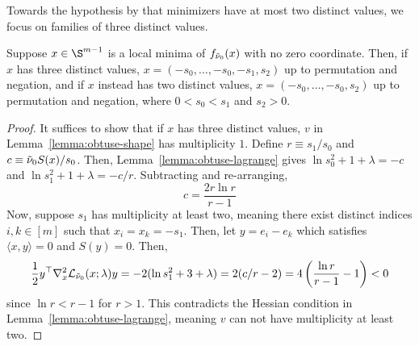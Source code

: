\documentclass[11pt]{article}
\begin{document}
Towards the hypothesis by \citep{holevo2025quantum} that minimizers have at most two distinct values, we focus on families of three distinct values. 
\begin{lemma}\label{lemma:obtuse-shape-final}
   Suppose $x\in \S^{m-1}$ is a local minima of $f_{{\Tilde \nu_0}}(x)$ with no zero coordinate. Then, if $x$ has three distinct values, $x=(-s_0,\dots,-s_0,-s_1,s_2)$ up to permutation and negation, and if $x$ instead has two distinct values, $x=(-s_0,\dots,-s_0,s_2)$ up to permutation and negation, where $0<s_0<s_1$ and $s_2>0$.
\end{lemma}
\begin{proof}
   It suffices to show that if $x$ has three distinct values, $v$ in Lemma~\ref{lemma:obtuse-shape} has multiplicity $1$.  
   Define $r\equiv s_1/s_0$ and $c\equiv {\Tilde \nu_0} S(x)/s_0$. Then, Lemma~\ref{lemma:obtuse-lagrange} gives $\ln s_0^2 +1 +\lambda =-c$ and $\ln s_1^2 +1+\lambda =-c/r$. Subtracting and re-arranging, 
   \begin{equation}\label{eq:obtuse-c(r)}
       c=\frac{2r\ln r }{r-1}
   \end{equation}
   Now, suppose $s_1$ has multiplicity at least two, meaning there exist distinct indices $i,k\in [m]$ such that $x_i=x_k=-s_1$. Then, let $y=e_i-e_k$ which satisfies $\langle x,y\rangle=0$ and $S(y)=0$. Then, 
   \begin{equation}
        \frac 1 2 y^\top \nabla^2_x \mathcal L _{{\Tilde \nu_0}}(x;\lambda)y=-2(\ln s_1^2 + 3+\lambda)=2(c/r-2)=4\left(\frac{\ln r }{r-1}-1\right)<0
   \end{equation}
   since $\ln r < r-1$ for $r>1$. This contradicts the Hessian condition in Lemma~\ref{lemma:obtuse-lagrange}, meaning $v$ can not have multiplicity at least two. 
\end{proof}
\end{document}
